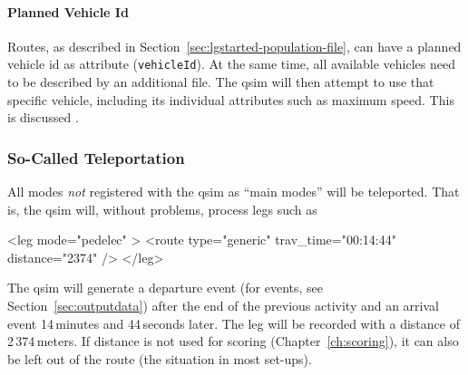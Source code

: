 
\paragraph{Planned Vehicle Id}
Routes, as described in Section~\ref{sec:lgstarted-population-file}, can have a planned vehicle \gls{id} as attribute (\lstinline|vehicleId|).  
At the same time, all available vehicles need to be described by an additional file. 
The \gls{qsim} will then attempt to use that specific vehicle, including its individual attributes such as maximum speed.  
This is discussed .


\subsubsection{So-Called Teleportation}
\label{sec:teleportation-qsim}
All modes \emph{not} registered with the \gls{qsim} as ``main modes'' will be teleported.  That is, the \gls{qsim} will, without problems, process legs such as
\begin{xml}
<leg mode="pedelec" >
   <route type="generic" trav_time="00:14:44" distance="2374" />
</leg>
\end{xml}
The \gls{qsim} will generate a departure event (for events, see Section~\ref{sec:outputdata}) after the end of the previous activity and an arrival event 14\,minutes and 44\,seconds later.  The leg will be recorded with a distance of 2\,374\,meters.  If  distance is not used for  scoring (\cf Chapter~\ref{ch:scoring}), it can also be left out of the route (the situation in most set-ups).

